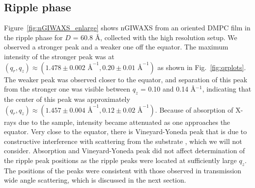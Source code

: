 \subsection{Ripple phase}\label{sec:nGIWAXS_ripple_phase}
Figure~\ref{fig:nGIWAXS_enlarge} shows nGIWAXS from an oriented DMPC film
in the ripple phase for $D$ = 60.8 \AA, collected with the high resolution setup. 
We observed a stronger peak and a weaker one off the equator. 
The maximum intensity of the stronger peak was at 
$(q_r, q_z) \approx (1.478 \pm 0.002 \text{ \AA}^{-1}, 0.20 \pm 0.01 \text{ \AA}^{-1})$ as shown
in Fig.~\ref{fig:qrplots}. The weaker peak was observed closer to the equator, and
separation of this peak from the stronger one was visible between 
$q_z$ = 0.10 and 0.14 \AA$^{-1}$, indicating that the center of this peak was approximately
$(q_r, q_z) \approx (1.457 \pm 0.004 \text{ \AA}^{-1}, 0.12 \pm 0.02 \text{ \AA}^{-1})$. 
Because of absorption of X-rays due to the sample, 
intensity became attenuated as one approaches the equator.
Very close to the equator, there is Vineyard-Yoneda 
peak that is due to constructive interference with scattering from the substrate
\cite{ref:Vineyard82,ref:Miller08},
which we will not consider.
Absorption and Vineyard-Yoneda peak did not affect determination of the 
ripple peak positions
as the ripple peaks were located at sufficiently large $q_z$. 
The positions of the peaks were consistent with those observed in 
transmission wide angle scattering, which is discussed in the next section.


